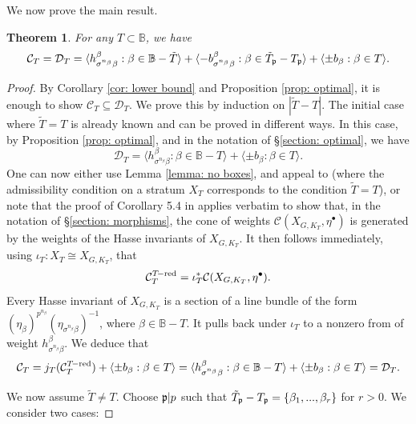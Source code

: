 \documentclass[11pt,pdflatex]{amsart}
\theoremstyle{plain}
\theoremstyle{definition}
\theoremstyle{plain}
\newtheorem{thm}[theorem]{Theorem}
\theoremstyle{definition}
\theoremstyle{remark}
\numberwithin{equation}{section}
\numberwithin{figure}{section} \numberwithin{table}{subsection}
\newcommand{\gerp}{{\frak{p}}}
\newcommand{\calC}{{\mathcal{C}}}
\newcommand{\calD}{{\mathcal{D}}}
\def\BB{\mathbb{B}}
\begin{document}
We now prove the main result.

\begin{thm} \label{thm:main}For any $T \subset \BB$, we have $$\calC_T=\calD_T=\langle h_{\sigma^{n_\beta}{\beta}}^\beta: \beta \in \BB-\tilde{T} \rangle    + \langle-b_{\sigma^{n_\beta}\beta}^\beta: \beta \in \tilde{T}_\gerp-T_\gerp \rangle + \langle \pm b_\beta: \beta \in T \rangle.$$

\end{thm}


\begin{proof} By Corollary \ref{cor: lower bound} and Proposition \ref{prop: optimal}, it is enough to show $\calC_T \subseteq \calD_T$. We
 prove this by induction on $|\tilde{T}-T|$. The initial case where $\tilde{T}=T$ is already known and can be proved in different ways. In this case, by Proposition \ref{prop: optimal}, and in the notation of \S \ref{section: optimal}, we have 
$$\calD_T=\langle h_{\sigma^{n_\beta}{\beta}}^\beta: \beta \in \BB-T \rangle + \langle \pm b_\beta: \beta \in T \rangle.$$
One can now either use Lemma \ref{lemma: no boxes}, and  appeal to \cite{GK} (where the admissibility condition on a stratum $X_T$ corresponds to the condition $\tilde{T}=T$), or note that the proof of  Corollary 5.4 in \cite{DK1} applies verbatim to show that, in the notation of \S \ref{section: morphisms}, the cone of weights  $\calC(X_{G,K_T},\eta^\bullet)$ is generated by the weights of the  Hasse invariants of $X_{G,K_T}$. It then follows immediately, using $\iota_T: X_T \cong X_{G,K_T}$, that $$\calC_T^{T\!-\rm red}=\iota_T^*\calC(X_{G,K_T},\eta^\bullet).$$ Every Hasse invariant of $X_{G,K_T}$ is a section of a line bundle of the form $(\eta_{\beta})^{p^{n_\beta}}(\eta_{\sigma^{n_\beta}\beta})^{-1}$, where $\beta \in \BB-T$. It pulls back under $\iota_T$ to a nonzero from of weight $h_{\sigma^{n_\beta}\beta}^\beta$.  We deduce that 
$$\calC_T=j_T(\calC_T^{T\!-\rm red})+ \langle \pm b_\beta: \beta \in T\rangle = \langle h_{\sigma^{n_\beta}{\beta}}^\beta: \beta \in \BB-T \rangle + \langle \pm b_\beta: \beta \in T \rangle=\calD_T.$$

We now assume $\tilde{T} \neq T$. Choose $\gerp|p$ such that $\tilde{T}_\gerp-T_\gerp=\{\beta_1,...,\beta_r\}$ for $r>0$. We consider two cases: 

\vspace{2mm}


\end{proof}
\end{document}
